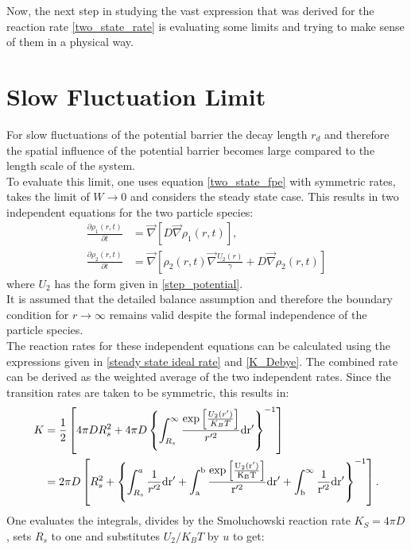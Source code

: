 Now, the next step in studying the vast expression that was derived for the reaction rate \eqref{two_state_rate} is evaluating some limits and trying to make sense of them in a physical way.
\section{Slow Fluctuation Limit}
\label{lim_long_rd}
For slow fluctuations of the potential barrier the decay length $r_d$ and therefore the spatial influence of the potential barrier becomes large compared to the length scale of the system. \\ 
To evaluate this limit, one uses equation \eqref{two_state_fpe} with symmetric rates, takes the limit of $W \rightarrow 0$ and considers the steady state case.
This results in two independent equations for the two particle species:
\begin{align}
    \frac{\partial \rho_1(r,t)}{\partial t} &= \vec \nabla \left[ D \vec \nabla \rho_1(r,t) \right], \\ \nonumber
    \frac{\partial \rho_2(r,t)}{\partial t} &= \vec \nabla \left[\rho_2(r,t) \vec \nabla \frac{U_2(r)}{\gamma} + D \vec \nabla \rho_2(r,t) \right]
    \label{two_state_fpe_W_to_0}
\end{align}
where $U_2$ has the form given in \eqref{step_potential}. \\
It is assumed that the detailed balance assumption and therefore the boundary condition for $r \rightarrow \infty$ remains valid despite the formal independence of the particle species.\\
The reaction rates for these independent equations can be calculated using the expressions given in \eqref{steady state ideal rate} and \eqref{K_Debye}. The combined rate can be derived as the weighted average of the two independent rates. Since the transition rates are taken to be symmetric, this results in:
\begin{align}
    K &= \frac{1}{2} \left[ 4 \pi D R_s^2 + 4 \pi D  \left\{\int_{R_s}^{\infty} \frac{\exp \left[ \frac{U_2(r')}{K_B T}\right]}{r'^2} \rm d r' \right\}^{-1} \right] \\ \nonumber
    &= 2 \pi D \left[ R_s^2 +\left\{\int_{R_s}^{a} \frac{1}{r'^2} \rm d r' + \int_{a}^{b} \frac{\exp \left[ \frac{U_2(r')}{K_B T}\right]}{r'^2} \rm d r' + \int_{b}^{\infty} \frac{1}{r'^2} \rm d r' \right\}^{-1} \right].
\end{align}
One evaluates the integrals, divides by the Smoluchowski reaction rate $K_S = 4 \pi D$, sets $R_s$ to one and substitutes $U_2/K_B T$ by $u$ to get:
